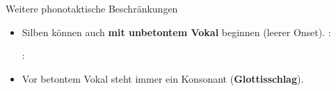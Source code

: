 \begin{frame}{Weitere phonotaktische Beschränkungen}
	
\begin{itemize}	
	\item Silben können auch \textbf{mit unbetontem Vokal} beginnen (\ras leerer Onset).
	\ea {}: 
	\z
	
	\ea {}:  
	\z

\pause 
	
	\item Vor betontem Vokal steht immer ein Konsonant (\textbf{Glottisschlag}).
	
	\ea
	\z

\end{itemize}

\end{frame}

